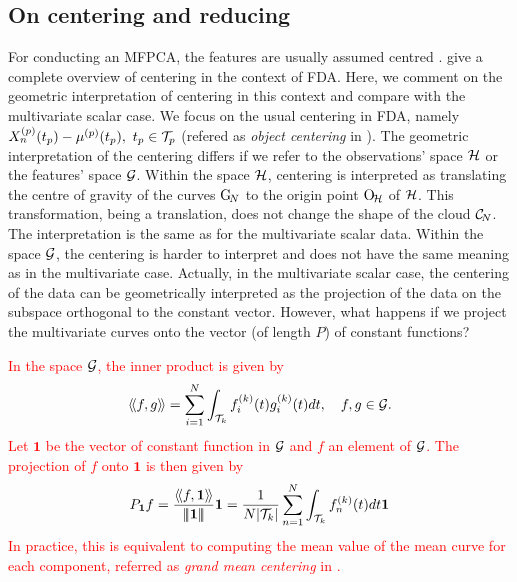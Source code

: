 \subsection{On centering and reducing} %
\label{sub:on_centering_and_reducing}

For conducting an MFPCA, the features are usually assumed centred \citep{happMultivariateFunctionalPrincipal2018a}. \cite{protheroNewPerspectivesCentering2021} give a complete overview of centering in the context of FDA. Here, we comment on the geometric interpretation of centering in this context and compare with the multivariate scalar case. We focus on the usual centering in FDA, namely $X_n^{(p)}(t_p) - \mu^{(p)}(t_p),~t_p \in \mathcal{T}_{p}$ (refered as \emph{object centering} in \cite{protheroNewPerspectivesCentering2021}).
The geometric interpretation of the centering differs if we refer to the observations' space $\mathcal{H}$ or the features' space $\mathcal{G}$. Within the space $\mathcal{H}$, centering is interpreted as translating the centre of gravity of the curves $\mathrm{G}_{\!N}$ to the origin point $\mathrm{O}_{\!\mathcal{H}}$ of $\mathcal{H}$. This transformation, being a translation, does not change the shape of the cloud $\mathcal{C}_{\!N}$. The interpretation is the same as for the multivariate scalar data. Within the space $\mathcal{G}$, the centering is harder to interpret and does not have the same meaning as in the multivariate case. Actually, in the multivariate scalar case, the centering of the data can be geometrically interpreted as the projection of the data on the subspace orthogonal to the constant vector. However, what happens if we project the multivariate curves onto the vector (of length $P$) of constant functions?


\textcolor{red}{In the space $\mathcal{G}$, the inner product is given by
\begin{equation}
\langle\!\langle f, g\rangle\!\rangle = \sum_{i = 1}^N \int_{\mathcal{T}_{k}} f^{(k)}_i(t)g^{(k)}_i(t)dt, \quad f, g \in \mathcal{G}.
\end{equation}
Let $\mathbf{1}$ be the vector of constant function in $\mathcal{G}$ and $f$ an element of $\mathcal{G}$. The projection of $f$ onto $\mathbf{1}$ is then given by
\begin{equation}
P_{\mathbf{1}}f = \frac{\langle\!\langle f, \mathbf{1}\rangle\!\rangle}{\left|\!\left|\!\left|\mathbf{1}\right|\!\right|\!\right|}\mathbf{1} = \frac{1}{N\lvert \mathcal{T}_{k} \rvert}\sum_{n = 1}^N \int_{\mathcal{T}_{k}} f^{(k)}_n(t)dt\mathbf{1}
\end{equation}
In practice, this is equivalent to computing the mean value of the mean curve for each component, referred as \emph{grand mean centering} in \cite{protheroNewPerspectivesCentering2021}.}

